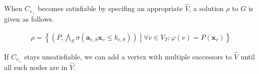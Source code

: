 \documentclass[a4paper,12pt]{article}
\begin{document}
When $C_{v_\bot}$ becomes satisfiable by specifing an appropriate
$\hat V$, a solution $\rho$ to $G$ is given as follows.

\begin{align*}
 \rho = \left\lbrace
  \left( P, \bigwedge_S \sigma(\mathbf{a}_{v,S} \mathbf{x}_v \leq b_{v,S}) \right) \middle|
  \forall v \in V_T; \varphi(v) = P(\mathbf{x}_v)
 \right\rbrace
\end{align*}

If $C_{v_\bot}$ stays unsatisfiable, we can add a vertex with multiple
successors to $\hat V$ until all such nodes are in $\hat V$.
\end{document}
